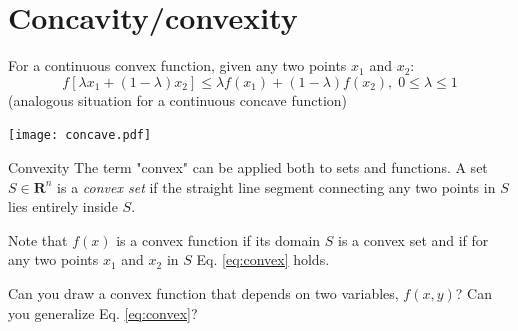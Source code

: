 \documentclass[c]{beamer}
\begin{document}
\section{Concavity/convexity}

\begin{frame}[allowframebreaks]
  For a continuous convex function, given any two points $x_1$ and $x_2$:
  \begin{equation}
  f[\lambda x_1 +(1-\lambda)x_2] \leq \lambda f(x_1) +(1-\lambda) f(x_2), \; 0 \leq \lambda \leq 1
\label{eq:convex}
\end{equation}
    (analogous situation for a continuous concave function)
  \begin{center}
    \texttt{[image: concave.pdf]}
  \end{center}

\begin{block}{Convexity}
    The term "convex" can be applied both to sets and functions. A set $S\in \mathbf{R}^n$ is a {\it convex set} if the straight line segment connecting any two points in $S$ lies entirely inside $S$.
\end{block}
Note that $f(x)$ is a convex function if its domain $S$ is a convex set and if for any two points $x_1$ and $x_2$ in $S$ Eq. \ref{eq:convex} holds.

\begin{Exercise}
  Can you draw a convex function that depends on two variables, $f(x,y)$? Can you generalize Eq. \ref{eq:convex}?
\end{Exercise}

\end{frame}
\end{document}
